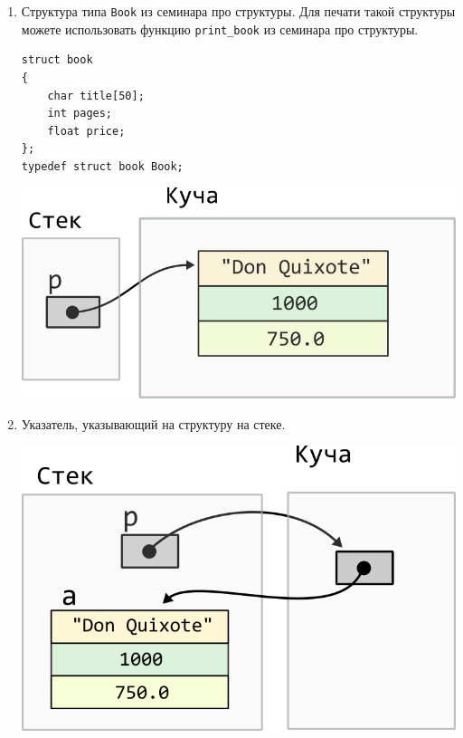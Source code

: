 \documentclass{article}
\begin{document}
\begin{enumerate}
\item Структура типа \texttt{Book} из семинара про структуры. Для печати такой структуры можете использовать функцию \texttt{print\_book} из семинара про структуры.
\begin{lstlisting}
struct book 
{
    char title[50];
    int pages;
    float price;
};
typedef struct book Book;
\end{lstlisting}
\begin{center}
\includegraphics[scale=\mallocImagesScale]{../images/malloc_homework/03heap_struct_book.png}
\end{center}

\newpage
\item Указатель, указывающий на структуру на стеке.
\begin{center}
\includegraphics[scale=\mallocImagesScale]{../images/malloc_homework/04heap_pointer_stack_struct_book.png}
\end{center}



\end{enumerate}
\end{document}
